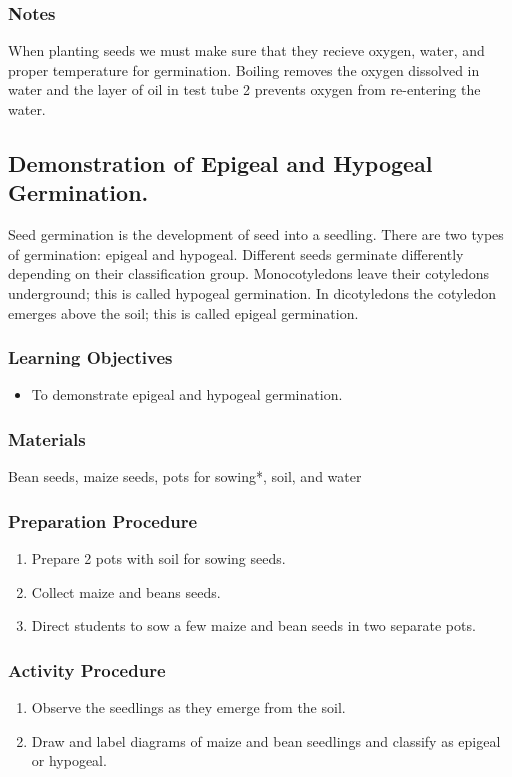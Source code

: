 \subsubsection*{Notes}
When planting seeds we must make sure that they recieve oxygen, water, and proper temperature for germination. Boiling removes the oxygen dissolved in water and the layer of oil in test tube 2 prevents oxygen from re-entering the water.

\subsection{Demonstration of Epigeal and Hypogeal Germination.}
Seed germination is the development of seed into a seedling. There are two types of germination: epigeal and hypogeal. Different seeds germinate differently depending on their classification group. Monocotyledons leave their cotyledons underground; this is called hypogeal germination. In dicotyledons the cotyledon emerges above the soil; this is called epigeal germination.

\subsubsection*{Learning Objectives}
\begin{itemize}
\item{To demonstrate epigeal and hypogeal germination.}
\end{itemize}

\subsubsection*{Materials}
Bean seeds, maize seeds, pots for sowing*, soil, and water

\subsubsection*{Preparation Procedure}
\begin{enumerate}
\item{Prepare 2 pots with soil for sowing seeds.}
\item{Collect maize and beans seeds.}
\item{Direct students to sow a few maize and bean seeds in two separate pots.}
\end{enumerate}

\subsubsection*{Activity Procedure}
\begin{enumerate}
\item{Observe the seedlings as they emerge from the soil.}
\item{Draw and label diagrams of maize and bean seedlings and classify as epigeal or hypogeal.}
\end{enumerate}

